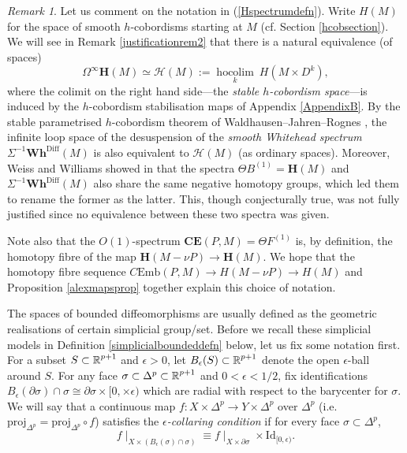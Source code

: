 \documentclass[a4paper, oneside]{amsart}
\DeclareMathOperator{\hocolim}{\operatorname{hocolim}}
\newcommand{\diff}{\mathrm{Diff}}
\newcommand{\cemb}{C\mathrm{Emb}}
\newcommand{\1}{\mathds{1}}
\theoremstyle{remark}
\newtheorem{rem}[thm]{Remark}%
\theoremstyle{definition}
\newcommand{\R}{{\scaleobj{0.97}{\mathbb{R}}}}
\newcommand{\Hsp}{\mathbf{H}}
\newcommand{\CEsp}{\mathbf{CE}}
\newcommand{\Whsp}{\mathbf{Wh}^{\diff}}
\numberwithin{equation}{section}
\begin{document}
\begin{rem}\label{justificationrem1}
    Let us comment on the notation in (\ref{Hspectrumdefn}). Write $H(M)$ for the space of smooth $h$-cobordisms starting at $M$ (cf. Section \ref{hcobsection}). We will see in Remark \ref{justificationrem2} that there is a natural equivalence (of spaces)
   \begin{equation}\label{Hspinfloopsace}
\Omega^\infty \Hsp(M)\simeq \mathcal H(M):=\underset{k}{\hocolim}\  H(M\times D^k),
    \end{equation}
    where the colimit on the right hand side---the \textit{stable $h$-cobordism space}---is induced by the $h$-cobordism stabilisation maps of Appendix \ref{AppendixB}. By the stable parametrised $h$-cobordism theorem of Waldhausen--Jahren--Rognes \cite{WaldhausenParametrisedhcob}, the infinite loop space of the desuspension of the \textit{smooth Whitehead spectrum} $\Sigma^{-1}\Whsp(M)$ is also equivalent to $\mathcal H(M)$ (as ordinary spaces). Moreover, Weiss and Williams showed in \cite[Cor. 5.6]{WWI} that the spectra $\Theta B^{(1)}=\Hsp(M)$ and $\Sigma^{-1}\Whsp(M)$ also share the same negative homotopy groups, which led them to rename the former as the latter. This, though conjecturally true, was not fully justified since no equivalence between these two spectra was given. 
    
    Note also that the $O(1)$-spectrum $\CEsp(P,M)=\Theta F^{(1)}$ is, by definition, the homotopy fibre of the map $\Hsp(M-\nu P)\to \Hsp(M)$. We hope that the homotopy fibre sequence $\cemb(P,M)\to H(M-\nu P)\to H(M)$ and Proposition \ref{alexmapsprop} together explain this choice of notation.
\end{rem}



The spaces of bounded diffeomorphisms are usually defined as the geometric realisations of certain simplicial group/set. Before we recall these simplicial models in Definition \ref{simplicialboundeddefn} below, let us fix some notation first. For a subset $S\subset \R^{p+1}$ and $\epsilon>0$, let $B_\epsilon(S)\subset \R^{p+1}$ denote the open $\epsilon$-ball around $S$. For any face $\sigma\subset \Delta^p\subset \R^{p+1}$ and $0<\epsilon<1/2$, fix identifications $B_\epsilon(\partial\sigma)\cap\sigma\cong \partial\sigma\times[0,\times\epsilon)$ which are radial with respect to the barycenter for $\sigma$. We will say that a continuous map $f: X\times \Delta^p\to Y\times \Delta^p$ over $\Delta^p$ (i.e. $\mathrm{proj}_{\Delta^p}=\mathrm{proj}_{\Delta^p}\circ f$) satisfies the \textit{$\epsilon$-collaring condition} if for every face $\sigma\subset\Delta^p$,
$$
f\mid_{X\times (B_\epsilon(\sigma)\cap\sigma)}\equiv f\mid_{X\times \partial \sigma}\times \mathrm{Id}_{[0,\epsilon)}.
$$
\end{document}
